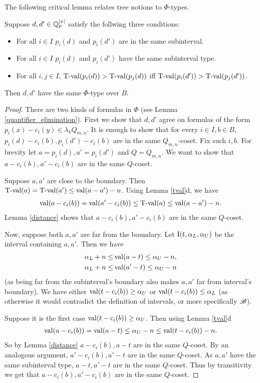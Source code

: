 \documentclass{amsart}
\begin{document}
The following critical lemma relates tree notions to $\Phi$-types.
\begin{Lemma} \label{main_lemma}
  Suppose $d, d' \in \mathbb{Q}_p^{|x|}$ satisfy the follwing three conditions:
  \begin{itemize}
  \item For all $i \in I$ $p_i(d)$ and $p_i(d')$ are in the same subinterval.
  \item For all $i \in I$ $p_i(d)$ and $p_i(d')$ have the same subinterval type.
  \item For all $i,j \in I$, $\operatorname{T-val}(p_i(d)) > \operatorname{T-val}(p_j(d))$ iff $\operatorname{T-val}(p_i(d')) > \operatorname{T-val}(p_j(d'))$.
  \end{itemize}
  Then $d, d'$ have the same $\Phi$-type over $B$.
\end{Lemma}
\begin{proof}
  There are two kinds of formulas in $\Phi$
  (see Lemma \ref{quantifier_elimination}).
  First we show that $d, d'$ agree on formulas of the form $p_i(x) - c_i(y) \in \lambda_k Q_{m,n}$.
  It is enough to show that for every $i \in I, b \in B$, $p_i(d) - c_i(b), p_i(d') - c_i(b)$ are in the same $Q_{m,n}$-coset.
  Fix such $i, b$.
  For brevity let $a = p_i(d), a' = p_i(d')$ and $Q = Q_{m,n}$.
  We want to show that $a - c_i(b), a' - c_i(b)$ are in the same $Q$-coset.
  
  Suppose $a, a'$ are close to the boundary.
  Then $\operatorname{T-val}(a) = \operatorname{T-val}(a') \leq \operatorname{val}(a - a') - n$.
  Using Lemma \ref{tval}d, we have
  \begin{align*}
    \operatorname{val}(a - c_i(b)) = \operatorname{val}(a' - c_i(b)) \leq \operatorname{T-val}(a) \leq \operatorname{val}(a - a') - n.
  \end{align*}
  Lemma \ref{distance} shows that $a - c_i(b), a' - c_i(b)$ are in the same $Q$-coset.
  
  Now, suppose both $a, a'$ are far from the boundary.
  Let $\operatorname{I}(t, \alpha_L, \alpha_U)$ be the interval containing $a, a'$.
  Then we have 
  \begin{align*}
    \alpha_L + n \leq &\operatorname{val} (a - t) \leq \alpha_U - n, \\
    \alpha_L + n \leq &\operatorname{val} (a' - t) \leq \alpha_U - n
  \end{align*}
  (as being far from the subinterval's boundary also makes $a,a'$ far from interval's boundary).
  We have either $\operatorname{val}(t - c_i(b)) \geq \alpha_U$ or $\operatorname{val}(t - c_i(b)) \leq \alpha_L$ (as otherwise it would contradict the definition of intervals, or more specifically $\mathscr B$).
  
  Suppose it is the first case $\operatorname{val}(t - c_i(b)) \geq \alpha_U$.
  Then using Lemma \ref{tval}d
  \begin{align*}
    \operatorname{val}(a - c_i(b)) = \operatorname{val}(a - t) \leq \alpha_U - n \leq \operatorname{val}(t - c_i(b)) - n.
  \end{align*}
  So by Lemma \ref{distance} $a - c_i(b), a - t$ are in the same $Q$-coset.
  By an analogous argument, $a' - c_i(b), a' - t$ are in the same $Q$-coset.
  As $a, a'$ have the same subinterval type, $a - t, a' - t$ are in the same $Q$-coset.
  Thus by transitivity we get that $a - c_i(b), a' - c_i(b)$ are in the same $Q$-coset.
  

\end{proof}
\end{document}
